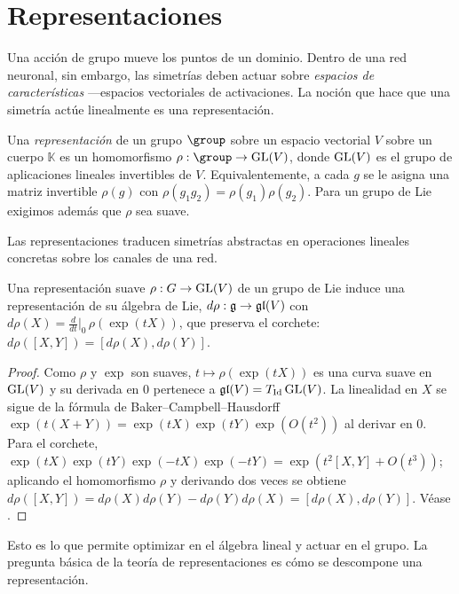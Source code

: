 \section{Representaciones}
\label{sec:found:representations}

Una acci\'on de grupo mueve los puntos de un dominio. Dentro de una red neuronal,
sin embargo, las simetr\'ias deben actuar sobre \emph{espacios de
caracter\'isticas} ---espacios vectoriales de activaciones. La noci\'on que hace que
una simetr\'ia act\'ue linealmente es una representaci\'on.

\begin{definition}[Representaci\'on]
\label{def:found:representation}
Una \emph{representaci\'on} de un grupo $\group$ sobre un espacio vectorial $V$
sobre un cuerpo $\mathbb{K}$ es un homomorfismo $\rho : \group \to \GL(V)$, donde
$\operatorname{GL}(V)$ es el grupo de aplicaciones lineales invertibles de $V$. Equivalentemente,
a cada $g$ se le asigna una matriz invertible $\rho(g)$ con $\rho(g_1 g_2) =
\rho(g_1)\rho(g_2)$. Para un grupo de Lie exigimos adem\'as que $\rho$ sea suave.
\end{definition}

Las representaciones traducen simetr\'ias abstractas en operaciones lineales
concretas sobre los canales de una red.

\begin{proposition}
\label{prop:found:drho}
Una representaci\'on suave $\rho : G \to \operatorname{GL}(V)$ de un grupo de Lie induce una
representaci\'on de su \'algebra de Lie, $d\rho : \mathfrak{g} \to \mathfrak{gl}(V)$ con
$d\rho(X) = \frac{d}{dt}\big|_0\, \rho(\exp(tX))$, que preserva el corchete:
$d\rho([X,Y]) = [d\rho(X), d\rho(Y)]$.
\end{proposition}

\begin{proof}
Como $\rho$ y $\exp$ son suaves, $t \mapsto \rho(\exp(tX))$ es una curva suave en
$\operatorname{GL}(V)$ y su derivada en $0$ pertenece a $\mathfrak{gl}(V) = T_{\mathrm{Id}}\operatorname{GL}(V)$. La
linealidad en $X$ se sigue de la f\'ormula de Baker--Campbell--Hausdorff
$\exp(t(X+Y)) = \exp(tX)\exp(tY)\exp(O(t^2))$ al derivar en $0$. Para el corchete,
$\exp(tX)\exp(tY)\exp(-tX)\exp(-tY) = \exp(t^2[X,Y] + O(t^3))$; aplicando el
homomorfismo $\rho$ y derivando dos veces se obtiene $d\rho([X,Y]) =
d\rho(X)d\rho(Y) - d\rho(Y)d\rho(X) = [d\rho(X), d\rho(Y)]$. V\'ease
\citep[Thm.~3.28]{Kirillov2008}.
\end{proof}

Esto es lo que permite optimizar en el \'algebra lineal y actuar en el grupo. La
pregunta b\'asica de la teor\'ia de representaciones es c\'omo se descompone una
representaci\'on.

